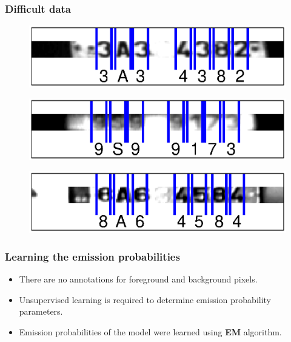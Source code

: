 \documentclass{beamer}
\begin{document}
\begin{frame}
  \frametitle{Difficult data}
\begin{figure}
\includegraphics[width=0.8\linewidth]{pics/bad1.eps}
\end{figure}

\begin{figure}
\includegraphics[width=0.8\linewidth]{pics/bad2.eps}
\end{figure}

\begin{figure}
\includegraphics[width=0.8\linewidth]{pics/bad3.eps}
\end{figure}

\end{frame}


\begin{frame}
  \frametitle{Learning the emission probabilities}
  \begin{itemize}
  \item There are no annotations for foreground and background pixels.
  \item Unsupervised learning is required to determine emission probability parameters.
  \item Emission probabilities of the model were learned using \textbf{EM} algorithm.
\end{itemize}
\end{frame}
\end{document}

